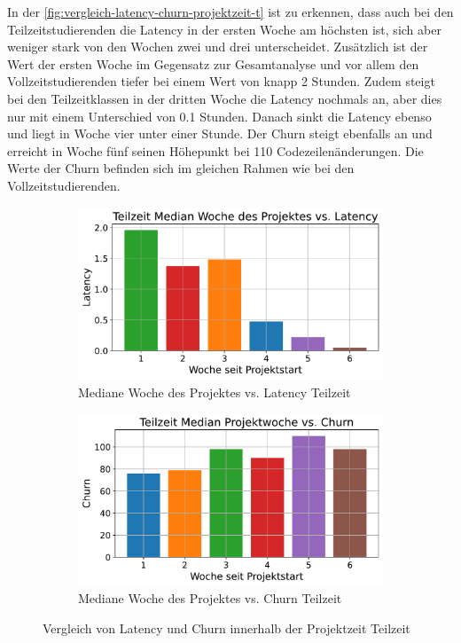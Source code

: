 In der \autoref{fig:vergleich-latency-churn-projektzeit-t} ist zu erkennen, dass auch bei den Teilzeitstudierenden die Latency in der ersten Woche am höchsten ist, sich aber weniger stark von den Wochen zwei und drei unterscheidet. Zusätzlich ist der Wert der ersten Woche im Gegensatz zur Gesamtanalyse und vor allem den Vollzeitstudierenden tiefer bei einem Wert von knapp 2 Stunden. Zudem steigt bei den Teilzeitklassen in der dritten Woche die Latency nochmals an, aber dies nur mit einem Unterschied von 0.1 Stunden. Danach sinkt die Latency ebenso und liegt in Woche vier unter einer Stunde. Der Churn steigt ebenfalls an und erreicht in Woche fünf seinen Höhepunkt bei 110 Codezeilenänderungen. Die Werte der Churn befinden sich im gleichen Rahmen wie bei den Vollzeitstudierenden.

\begin{figure}[htbp]
    \centering
    \begin{subfigure}[b]{0.48\textwidth}
        \centering
        \includegraphics[width=\textwidth]{Figures/mittelwert-woche-latency-t.pdf}
        \caption{Mediane Woche des Projektes vs. Latency Teilzeit}
        \label{fig:mittelwert-woche-lateny-t}
    \end{subfigure}
    \hfill
    \begin{subfigure}[b]{0.48\textwidth}
        \centering
        \includegraphics[width=\textwidth]{Figures/mittelwert-woche-churn-t.pdf}
        \caption{Mediane Woche des Projektes vs. Churn Teilzeit}
        \label{fig:mittelwert-woche-churn-t}
    \end{subfigure}
    \caption{Vergleich von Latency und Churn innerhalb der Projektzeit Teilzeit}
    \label{fig:vergleich-latency-churn-projektzeit-t}
\end{figure}

